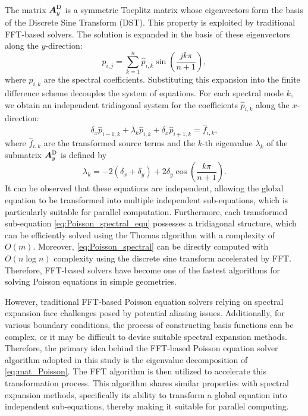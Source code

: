 \documentclass[preprint]{elsarticle}
\begin{document}
The matrix $\boldsymbol{A}_y^{\rm D}$ is a symmetric Toeplitz matrix whose eigenvectors form the basis of the Discrete Sine Transform (DST). This property is exploited by traditional FFT-based solvers. The solution is expanded in the basis of these eigenvectors along the $y$-direction:
\begin{equation}
    \label{eq:Poisson_spectral}
    p_{i,j}=\sum_{k=1}^{n}\hat{p}_{i,k}\sin\left(\frac{jk\pi}{n+1}\right),
\end{equation}
where $\hat{p}_{i,k}$ are the spectral coefficients. Substituting this expansion into the finite difference scheme decouples the system of equations. For each spectral mode $k$, we obtain an independent tridiagonal system for the coefficients $\hat{p}_{i,k}$ along the $x$-direction:
\begin{equation}
    \label{eq:Poisson_spectral_equ}
    \delta_x\hat{p}_{i-1,k} + \lambda_k \hat{p}_{i,k} + \delta_x\hat{p}_{i+1,k} = \hat{f}_{i,k},
\end{equation}
where $\hat{f}_{i,k}$ are the transformed source terms and the $k$-th eigenvalue $\lambda_k$ of the submatrix $\boldsymbol{A}_y^{\rm D}$ is defined by
\begin{equation}
    \label{eq:Poisson_spectral_eigen}
    \lambda_k = -2(\delta_x+\delta_y) + 2\delta_y\cos(\frac{k\pi}{n+1}).
\end{equation}
It can be observed that these equations are independent, allowing the global equation to be transformed into multiple independent sub-equations, which is particularly suitable for parallel computation. Furthermore, each transformed sub-equation \eqref{eq:Poisson_spectral_equ} possesses a tridiagonal structure, which can be efficiently solved using the Thomas algorithm with a complexity of $O(m)$. Moreover, \eqref{eq:Poisson_spectral} can be directly computed with $O(n \log n)$ complexity using the discrete sine transform accelerated by FFT. Therefore, FFT-based solvers have become one of the fastest algorithms for solving Poisson equations in simple geometries.

However, traditional FFT-based Poisson equation solvers relying on spectral expansion face challenges posed by potential aliasing issues. Additionally, for various boundary conditions, the process of constructing basis functions can be complex, or it may be difficult to devise suitable spectral expansion methods. Therefore, the primary idea behind the FFT-based Poisson equation solver algorithm adopted in this study is the eigenvalue decomposition of \eqref{eq:mat_Poisson}. The FFT algorithm is then utilized to accelerate this transformation process. This algorithm shares similar properties with spectral expansion methods, specifically its ability to transform a global equation into independent sub-equations, thereby making it suitable for parallel computing.
\end{document}

